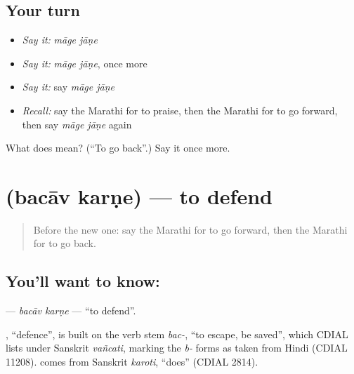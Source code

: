 \subsection*{Your turn}
\begin{itemize}
\raggedright
  \item \emph{Say it:} \emph{māge jāṇe}
  \item \emph{Say it:} \emph{māge jāṇe}, once more
  \item \emph{Say it:} say \emph{māge jāṇe}
  \item \emph{Recall:} say the Marathi for to praise, then the Marathi for to go forward, then say \emph{māge jāṇe} again
\end{itemize}

\begin{tcolorbox}[breakable,colback=teal!4,colframe=teal!35!black,title={Before you move on}]
What does   mean? (\textquotedblleft{}To go back\textquotedblright{}.) Say it once more.
\end{tcolorbox}
\section[\texorpdfstring{\mr{बचाव} \mr{करणे} (bacāv karṇe)}{बचाव करणे (bacāv karṇe)}]{  (bacāv karṇe) — to defend}

\label{lesson:MR-C228-bacav-karne}



\begin{quote}
Before the new one: say the Marathi for to go forward, then the Marathi for to go back.
\end{quote}

\subsection*{You'll want to know:  }
\textbf{ } — \emph{bacāv karṇe} — \textquotedblleft{}to defend\textquotedblright{}.

\begin{cousinweb}
\textbf{}, \textquotedblleft{}defence\textquotedblright{}, is built on the verb stem \emph{bac-}, \textquotedblleft{}to escape, be saved\textquotedblright{}, which CDIAL lists under Sanskrit \emph{vañcati}, marking the \emph{b-} forms as taken from Hindi (CDIAL 11208). \textbf{} comes from Sanskrit \emph{karoti}, \textquotedblleft{}does\textquotedblright{} (CDIAL 2814).
\end{cousinweb}

